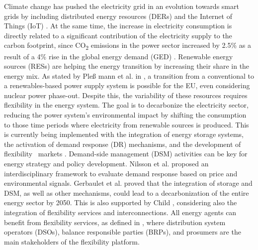 Climate change has pushed the electricity grid in an evolution towards smart grids by including distributed energy resources (DERs) and the {Internet of Things (IoT)} \cite{EuropeanCommission2012}. At the same time, the increase in electricity consumption is directly related to a significant contribution of the electricity supply to the carbon footprint, since CO\textsubscript 2 emissions in the power sector increased by 2.5\% as a result of a 4\% rise  in the global energy demand (GED) \cite{IEA2018}. Renewable energy sources (RESs) are helping the energy transition by increasing their share in the energy mix. {As stated by Ple{\ss}%
mann et al. in \cite{PLEMANN201719}, a transition from a conventional to a renewables-based power supply system is possible for the EU, even considering nuclear power phase-out.} Despite this, the variability of these resources requires flexibility in the energy system. The goal is to {decarbonize the electricity sector, reducing the power system's environmental impact by shifting the consumption to those time periods where electricity from renewable sources is produced}. This is currently being implemented with the integration of energy storage systems, the activation of demand response (DR) mechanisms, and the development of flexibility%
~markets \cite{USEFFoundation2015a,  LocalMicroPowerMarkets2019CH2}. Demand-side management (DSM) activities can be key for energy strategy and policy development. Nilsson et al. \cite{NILSSON2018273} proposed an interdisciplinary framework to evaluate demand response based on price and environmental signals.  {Gerbaulet et al. \cite{GERBAULET2019973} proved that the integration of storage and DSM, as well as other mechanisms, could lead to a decarbonization of the entire energy sector by 2050. This is also supported by Child \cite{CHILD201980}, considering also the integration of flexibility%
 services and interconnections. All energy agents can benefit from {flexibility}%
 services, as defined in \cite{Olivella2018}, where distribution system operators (DSOs), balance responsible parties (BRPs), and prosumers are the main stakeholders of the flexibility%
 platform.} 



